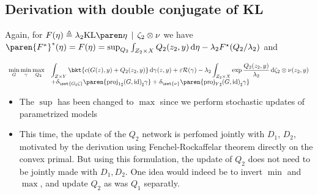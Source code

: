 \documentclass[11pt,a4paper]{article}
\begin{document}
\subsection{Derivation with double conjugate of KL}

Again, for $
F(\eta) \eqdef
\lambda_2 \KL{\eta}{\oprod{\zeta_2}{\nu}}$ we have
$\conj{\paren{\conj{F}}}(\eta) = F(\eta) = \sup_{Q_2}{\int_{\ZBX} {Q_2(z_2, y) \d \eta} - \lambda_2 F^{\star}( Q_2 / \lambda_2 )}$
and

\begin{equation}
    \label{eqn:anti-info-rotgan-bis}
    \begin{array}{*2{>{\displaystyle}l}}
        \min_{G} \min_{\gamma} \max_{Q_2} &\int_{\ZY}{ \bkt{c(G(z), y) + Q_2(z_2, y)}\d \gamma(z, y)}  + \eps \R(\gamma)- \lambda_2 \int_{\ZBX}{\exp{\frac{Q_2(z_2, y)}{\lambda_2}} \d \oprod{\zeta_2}{\nu}(z_2, y)} \\
                                          &+ \delta_{\set{\pf{G}{\zeta}}}\paren{ \pf{\proj{1}}{\pf{(G, \id)}{\gamma}} } + \delta_{\set{\nu}}\paren{\pf{\projY}{\pf{(G, \id)}{\gamma}}}
                  \end{array}
\end{equation}

%

\begin{rems}
    \begin{itemize}
        \item The $\sup$ has been changed to $\max$ since we perform stochastic updates of parametrized models
        \item This time, the update of the $Q_2$ network is perfomed jointly with
$D_1,\,D_2$, motivated by the derivation using Fenchel-Rockaffelar theorem
directly on the convex  primal. But using this formulation, the update of $Q_2$ does not need to be jointly made with $D_1, D_2$. One idea would indeed be to invert $\min$ and $\max$, and update $Q_2$ as was $Q_1$ separatly.
\end{itemize}
\end{rems}
\end{document}
